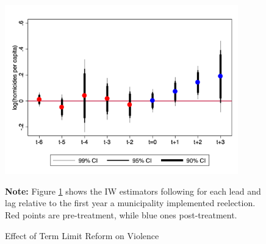 \documentclass[12pt]{amsart}
\numberwithin{equation}{section}
\theoremstyle{definition}
\theoremstyle{definition}
\theoremstyle{definition}
\begin{document}
\begin{figure}[H] 
\centering
 \caption{Effect of Term Limit Reform on Violence}
 \label{fig:as_violence}
\includegraphics[width=0.9\textwidth]{../Figures/catts_homicides.png}
       \captionsetup{justification=centering}
       
 \textbf{Note:} Figure \ref{fig:as_violence} shows the IW estimators following \citet{abraham_sun_2020} for each lead and lag relative to the first year a municipality implemented reelection. Red points are pre-treatment, while blue ones post-treatment. 
    
\end{figure}    
\end{document}
